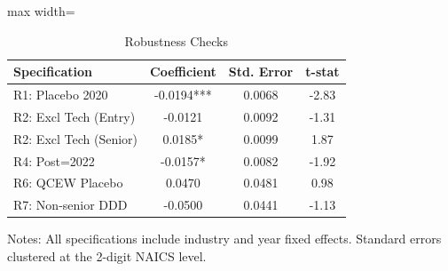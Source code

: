 \begin{table}[htbp]
\centering
\caption{Robustness Checks}
\label{tab:robustness}
\begin{adjustbox}{max width=\textwidth}
\begin{tabular}{lccc}
\hline\hline
Specification & Coefficient & Std. Error & t-stat \\
\hline
R1: Placebo 2020 & -0.0194*** & 0.0068 & -2.83 \\
R2: Excl Tech (Entry) & -0.0121 & 0.0092 & -1.31 \\
R2: Excl Tech (Senior) & 0.0185* & 0.0099 & 1.87 \\
R4: Post=2022 & -0.0157* & 0.0082 & -1.92 \\
R6: QCEW Placebo & 0.0470 & 0.0481 & 0.98 \\
R7: Non-senior DDD & -0.0500 & 0.0441 & -1.13 \\
\hline\hline
\end{tabular}
\end{adjustbox}
\begin{tablenotes}\small
\item Notes: All specifications include industry and year fixed effects.
Standard errors clustered at the 2-digit NAICS level.
\end{tablenotes}
\end{table}
